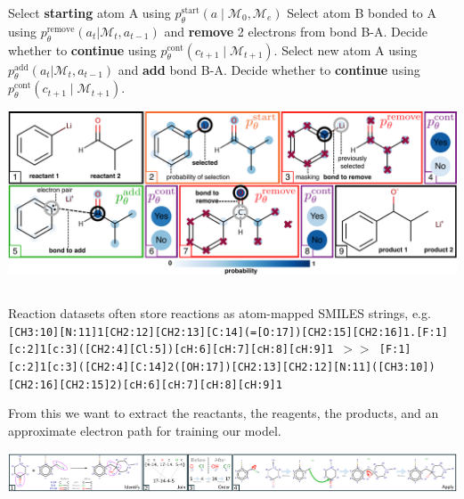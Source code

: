 \documentclass[a0paper,landscape]{tikzposter} %
\newcommand{\Mc}{{\mathcal{M}}}
\newcommand{\Ac}{{\mathcal{A}}}
\newcommand{\moleculeSet}{\Mc}
\begin{document}
\begin{columns}
{\begin{cols}
    \begin{algorithm}[H]
    \begin{algorithmic}[1]
      \State Select \textcolor{camorangePantone158}{\bf starting} atom A using 
      \textcolor{camorangePantone158}{\bf $p_\theta^{\mathrm{start}}(a \mid \moleculeSet_0, \moleculeSet_e)$}
      \MRepeat
      \State Select atom B bonded to A using \textcolor{reactionRemove}{\bf $p_\theta^{\mathrm{remove}}(a_t | \moleculeSet_t, a_{t-1})$}
        and \textcolor{reactionRemove}{\bf remove} 2 electrons from bond B-A.
        \State Decide whether to \textcolor{campurplePantone513}{\bf continue} using  \textcolor{campurplePantone513}{\bf $p_\theta^{\textrm{cont}}(c_{t+1} \mid \moleculeSet_{t+1})$}.
        \State Select new atom A using \textcolor{reactionAdd}{\bf $p_\theta^{\mathrm{add}}(a_t | \moleculeSet_t, a_{t-1})$} and \textcolor{reactionAdd}{\bf add} bond B-A.
        \State Decide whether to  \textcolor{campurplePantone513}{\bf continue} using  \textcolor{campurplePantone513}{\bf $p_\theta^{\textrm{cont}}(c_{t+1} \mid \moleculeSet_{t+1})$}.
      \EndRepeat
    \end{algorithmic}
    \end{algorithm}
  { \raggedright
    \includegraphics[width=\linewidth]{imgs/reaction_model_color_coded.pdf}
  }


  \end{cols}

  }


\end{columns}

{
  Reaction datasets often store reactions as atom-mapped SMILES strings, e.g.{ \tt  \small [CH3:10][N:11]1[CH2:12][CH2:13][C:14](=[O:17])[CH2:15][CH2:16]1.[F:1][c:2]1[c:3]([CH2:4][Cl:5])[cH:6][cH:7][cH:8][cH:9]1  $>>$
  [F:1][c:2]1[c:3]([CH2:4][C:14]2([OH:17])[CH2:13][CH2:12][N:11]([CH3:10])[CH2:16][CH2:15]2)[cH:6][cH:7][cH:8][cH:9]1}

  From this we want to extract the reactants, the reagents, the products, and an approximate electron path for training our model.

\includegraphics[width=\linewidth]{imgs/inkscape_img_edits/extract_path.pdf}
}
\end{document}
